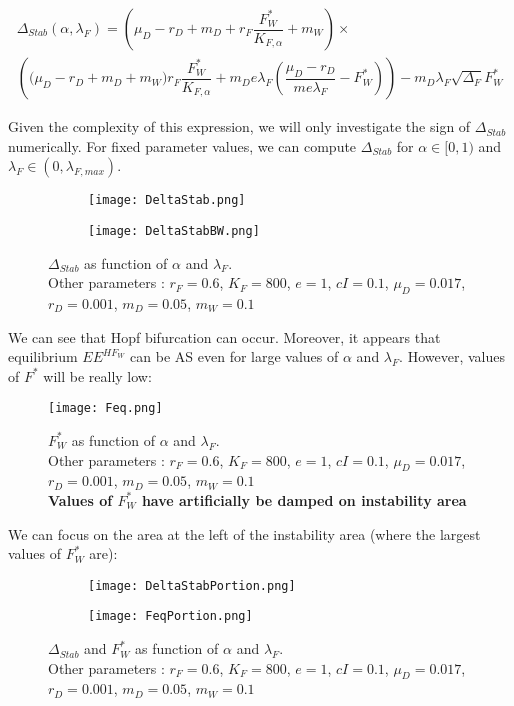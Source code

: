 \documentclass{article}
\newcommand{\lfw}{\lambda_{F}}
\newcommand{\lfw}{\lambda_{F}}
\begin{document}
\begin{multline*}
\Delta_{Stab}(\alpha, \lfw) = \left(\mu_D -r_D + m_D + r_F \dfrac{F_W^*}{K_{F, \alpha}} + m_W\right) \times \\
\left(\big( \mu_D -r_D + m_D + m_W) r_F \dfrac{F^*_W}{K_{F, \alpha}}   + m_D e\lfw   \left(\dfrac{\mu_D - r_D}{m e\lfw} - F^*_W \right)\right) - m_D \lfw \sqrt{\Delta_F}  F^*_{W} 
\end{multline*}


Given the complexity of this expression, we will only investigate the sign of $\Delta_{Stab}$ numerically. For fixed parameter values, we can compute $\Delta_{Stab}$ for $\alpha \in [0,1)$ and $ \lfw \in (0, \lambda_{F, max})$.

\begin{figure}[!ht]
\centering
\begin{subfigure}[b]{1\textwidth}
\centering
\texttt{[image: DeltaStab.png]}
\end{subfigure}
\begin{subfigure}[b]{1\textwidth}
\centering
\texttt{[image: DeltaStabBW.png]}
\end{subfigure}
\caption{\centering $\Delta_{Stab}$ as function of $\alpha$ and $\lfw$. \\
Other parameters : $r_F = 0.6$, $K_F = 800$, $e=1$, $cI = 0.1$, $\mu_D = 0.017$, $r_D = 0.001$, $m_D = 0.05$, $m_W = 0.1$}
\end{figure}

We can see that Hopf bifurcation can occur. Moreover, it appears that equilibrium $EE^{HF_W}$ can be AS even for large values of $\alpha$ and $\lfw$. However, values of $F^*$ will be really low:

\newpage
\begin{figure}[!ht]
\centering
\texttt{[image: Feq.png]}
\caption{\centering $F^*_W$ as function of $\alpha$ and $\lfw$. \\
Other parameters : $r_F = 0.6$, $K_F = 800$, $e=1$, $cI = 0.1$, $\mu_D = 0.017$, $r_D = 0.001$, $m_D = 0.05$, $m_W = 0.1$ \\
\textbf{Values of $F^*_W$ have artificially be damped on instability area}}
\end{figure}

\newpage
We can focus on the area at the left of the instability area (where the largest values of $F^*_W$ are):

\begin{figure}[!ht]
\centering
\begin{subfigure}[b]{1\textwidth}
\texttt{[image: DeltaStabPortion.png]}
\end{subfigure}
\begin{subfigure}[b]{1\textwidth}
\texttt{[image: FeqPortion.png]}
\end{subfigure}
\caption{\centering $\Delta_{Stab}$ and $F^*_W$ as function of $\alpha$ and $\lfw$. \\
Other parameters : $r_F = 0.6$, $K_F = 800$, $e=1$, $cI = 0.1$, $\mu_D = 0.017$, $r_D = 0.001$, $m_D = 0.05$, $m_W = 0.1$}
\end{figure}
\end{document}
